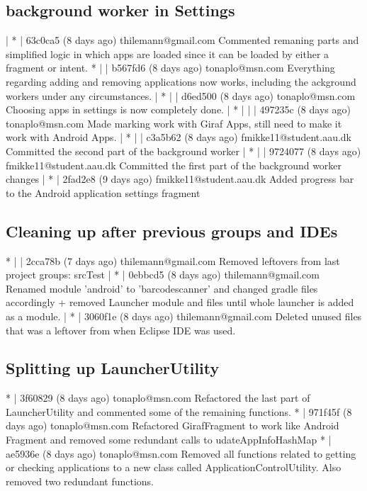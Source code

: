 \subsection{background worker in Settings}
| * | 63c0ca5 (8 days ago) thilemann@gmail.com Commented remaning parts and simplified logic in which apps are loaded since it can be loaded by either a fragment or intent.
* | | b567fd6 (8 days ago) tonaplo@msn.com Everything regarding adding and removing applications now works, including the ackground workers under any circumstances.
| * | | d6ed500 (8 days ago) tonaplo@msn.com Choosing apps in settings is now completely done.
| * | | | 497235c (8 days ago) tonaplo@msn.com Made marking work with Giraf Apps, still need to make it work with Android Apps.
| * | | c3a5b62 (8 days ago) fmikke11@student.aau.dk Committed the second part of the background worker
| * | | 9724077 (8 days ago) fmikke11@student.aau.dk Committed the first part of the background worker changes
| * | 2fad2e8 (9 days ago) fmikke11@student.aau.dk Added progress bar to the Android application settings fragment

\subsection{Cleaning up after previous groups and IDEs}
* | | 2cca78b (7 days ago) thilemann@gmail.com Removed leftovers from last project groups: srcTest
| * | 0ebbcd5 (8 days ago) thilemann@gmail.com Renamed module 'android' to 'barcodescanner' and changed gradle files accordingly + removed Launcher module and files until whole launcher is added as a module.
| * | 3060f1e (8 days ago) thilemann@gmail.com Deleted unused files that was a leftover from when Eclipse IDE was used.

\subsection{Splitting up LauncherUtility}
* | 3f60829 (8 days ago) tonaplo@msn.com Refactored the last part of LauncherUtility and commented some of the remaining functions.
* | 971f45f (8 days ago) tonaplo@msn.com Refactored GirafFragment to work like Android Fragment and removed some redundant calls to udateAppInfoHashMap
* | ae5936e (8 days ago) tonaplo@msn.com Removed all functions related to getting or checking applications to a new class called ApplicationControlUtility. Also removed two redundant functions.

